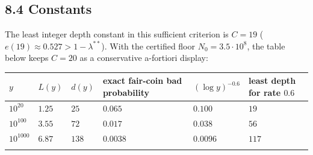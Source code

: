 \documentclass[11pt,a4paper]{article}
\begin{document}
\subsection{8.4 Constants}\label{constants}

The least integer depth constant in this sufficient criterion is
\(C=19\) (\(e(19)\approx0.527>1-\lambda^{**}\)). With the certified
floor \(N_0=3.5\cdot 10^8\), the table below keeps \(C=20\) as a
conservative a-fortiori display:

\begingroup\small

\begin{longtable}[]{@{}
  >{\raggedright\arraybackslash}p{}
  >{\raggedright\arraybackslash}p{}
  >{\raggedright\arraybackslash}p{}
  >{\raggedright\arraybackslash}p{}
  >{\raggedright\arraybackslash}p{}
  >{\raggedright\arraybackslash}p{}@{}}
\toprule\noalign{}
\begin{minipage}[b]{\linewidth}\raggedright
\(y\)
\end{minipage} & \begin{minipage}[b]{\linewidth}\raggedright
\(L(y)\)
\end{minipage} & \begin{minipage}[b]{\linewidth}\raggedright
\(d(y)\)
\end{minipage} & \begin{minipage}[b]{\linewidth}\raggedright
exact fair-coin bad probability
\end{minipage} & \begin{minipage}[b]{\linewidth}\raggedright
\((\log y)^{-0.6}\)
\end{minipage} & \begin{minipage}[b]{\linewidth}\raggedright
least depth for rate \(0.6\)
\end{minipage} \\
\midrule\noalign{}
\endhead
\bottomrule\noalign{}
\endfoot
\bottomrule\noalign{}
\endlastfoot
\(10^{20}\) & \(1.25\) & \(25\) & \(0.065\) & \(0.100\) & \(19\) \\
\(10^{100}\) & \(3.55\) & \(72\) & \(0.017\) & \(0.038\) & \(56\) \\
\(10^{1000}\) & \(6.87\) & \(138\) & \(0.0038\) & \(0.0096\) &
\(117\) \\*
\end{longtable}
\end{document}

